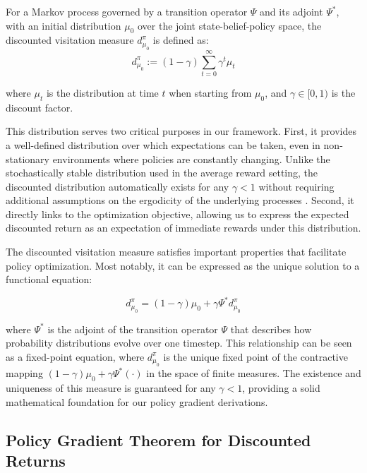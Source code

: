 \begin{definition}
    For a Markov process governed by a transition operator $\Psi$ and its adjoint $\Psi^*$, with an initial distribution $\mu_0$ over the joint state-belief-policy space, the discounted visitation measure $d^{\pi}_{\mu_0}$ is defined as:
    \begin{equation}
        d^{\pi}_{\mu_0} := (1-\gamma) \sum_{t=0}^{\infty} \gamma^t \mu_t
    \end{equation}

    where $\mu_t$ is the distribution at time $t$ when starting from $\mu_0$, and $\gamma \in [0, 1)$ is the discount factor.
\end{definition}

This distribution serves two critical purposes in our framework. First, it provides a well-defined distribution over which expectations can be taken, even in non-stationary environments where policies are constantly changing. Unlike the stochastically stable distribution used in the average reward setting, the discounted distribution automatically exists for any $\gamma < 1$ without requiring additional assumptions on the ergodicity of the underlying processes \citep{puterman1994markov}. Second, it directly links to the optimization objective, allowing us to express the expected discounted return as an expectation of immediate rewards under this distribution.

The discounted visitation measure satisfies important properties that facilitate policy optimization. Most notably, it can be expressed as the unique solution to a functional equation:

\begin{equation}
    d^{\pi}_{\mu_0} = (1-\gamma)\mu_0 + \gamma \Psi^* d^{\pi}_{\mu_0}
\end{equation}


where $\Psi^*$ is the adjoint of the transition operator $\Psi$ that describes how probability distributions evolve over one timestep. This relationship can be seen as a fixed-point equation, where $d^{\pi}_{\mu_0}$ is the unique fixed point of the contractive mapping $(1-\gamma)\mu_0 + \gamma \Psi^*(\cdot)$ in the space of finite measures. The existence and uniqueness of this measure is guaranteed for any $\gamma < 1$, providing a solid mathematical foundation for our policy gradient derivations.

\subsection{Policy Gradient Theorem for Discounted Returns}


